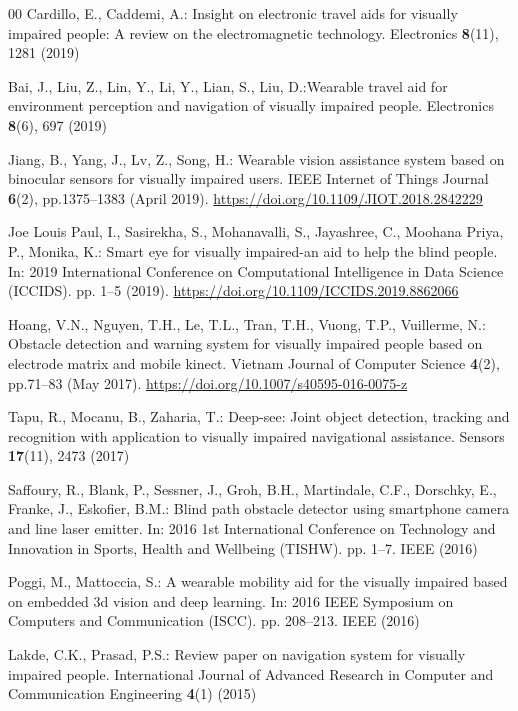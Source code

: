 \documentclass[final,5p,times,twocolumn]{elsarticle}
\begin{document}
\begin{thebibliography}{00}
Cardillo, E., Caddemi, A.: Insight on electronic travel aids for visually impaired people: A review on the electromagnetic technology. Electronics \textbf{8}(11), 1281 (2019)

Bai, J., Liu, Z., Lin, Y., Li, Y., Lian, S., Liu, D.:Wearable travel aid for environment perception and navigation of visually impaired people. Electronics \textbf{8}(6), 697 (2019)

Jiang, B., Yang, J., Lv, Z., Song, H.: Wearable vision assistance system based on binocular sensors for visually impaired users. IEEE Internet of Things Journal \textbf{6}(2), pp.1375--1383 (April 2019). \url{https://doi.org/10.1109/JIOT.2018.2842229}

Joe Louis Paul, I., Sasirekha, S., Mohanavalli, S., Jayashree, C., Moohana Priya, P., Monika, K.: Smart eye for visually impaired-an aid to help the blind people. In: 2019 International Conference on Computational Intelligence in Data Science (ICCIDS). pp. 1--5 (2019). \url{https://doi.org/10.1109/ICCIDS.2019.8862066}

Hoang, V.N., Nguyen, T.H., Le, T.L., Tran, T.H., Vuong, T.P., Vuillerme, N.: Obstacle detection and warning system for visually impaired people based on electrode matrix and mobile kinect. Vietnam Journal of Computer Science \textbf{4}(2), pp.71--83 (May 2017). \url{https://doi.org/10.1007/s40595-016-0075-z}

Tapu, R., Mocanu, B., Zaharia, T.: Deep-see: Joint object detection, tracking and recognition with application to visually impaired navigational assistance. Sensors \textbf{17}(11), 2473 (2017)

Saffoury, R., Blank, P., Sessner, J., Groh, B.H., Martindale, C.F., Dorschky, E., Franke, J., Eskofier, B.M.: Blind path obstacle detector using smartphone camera and line laser emitter. In: 2016 1st International Conference on Technology and Innovation in Sports, Health and Wellbeing (TISHW). pp. 1--7. IEEE (2016)

Poggi, M., Mattoccia, S.: A wearable mobility aid for the visually impaired based on embedded 3d vision and deep learning. In: 2016 IEEE Symposium on Computers and Communication (ISCC). pp. 208--213. IEEE (2016)

Lakde, C.K., Prasad, P.S.: Review paper on navigation system for visually impaired people. International Journal of Advanced Research in Computer and Communication Engineering \textbf{4}(1) (2015)


\end{thebibliography}
\end{document}
